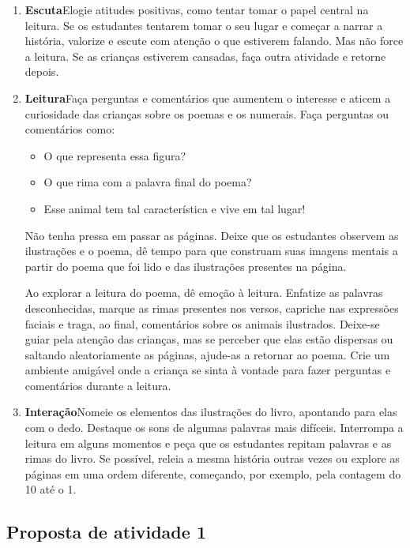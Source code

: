 \documentclass[11pt]{extarticle}
\begin{document}
\begin{enumerate}
\item \textbf{Escuta}\quad Elogie atitudes positivas, como 
tentar tomar o papel central na leitura. Se os estudantes tentarem 
tomar o seu lugar e começar a narrar a história, valorize e escute com atenção o que estiverem falando. Mas não 
force a leitura. Se as crianças estiverem cansadas, faça outra atividade 
e retorne depois. 

\item \textbf{Leitura}\quad Faça perguntas e comentários que aumentem o 
interesse e aticem a curiosidade das crianças sobre os poemas e os numerais. Faça 
perguntas ou comentários como: 

\begin{itemize}
\item O que representa essa figura?
\item O que rima com a palavra final do poema?
\item Esse animal tem tal característica e vive em tal lugar!
\end{itemize}

Não tenha pressa em passar as páginas. Deixe que os estudantes 
observem as ilustrações e o poema, dê tempo para que construam suas imagens 
mentais a partir do poema que foi lido e das ilustrações presentes na página. 

Ao explorar a leitura do poema, dê emoção 
à leitura. Enfatize as palavras desconhecidas, marque as rimas presentes nos versos,
capriche nas expressões faciais e traga, ao final, comentários sobre os animais ilustrados.
Deixe-se guiar pela atenção das crianças, mas se perceber que 
elas estão dispersas ou saltando aleatoriamente as páginas, ajude-as 
a retornar ao poema. Crie um ambiente amigável onde a criança 
se sinta à vontade para fazer perguntas e comentários durante a leitura.

\item \textbf{Interação}\quad Nomeie os elementos das ilustrações 
do livro, apontando para elas com o dedo. Destaque os sons de algumas 
palavras mais difíceis. Interrompa a leitura em alguns momentos e peça que 
os estudantes repitam palavras e as rimas do livro. Se possível, 
releia a mesma história outras vezes ou explore as páginas em uma ordem 
diferente, começando, por exemplo, pela contagem do 10 até o 1. 
\end{enumerate}


\subsection{Proposta de atividade 1}
\end{document}
